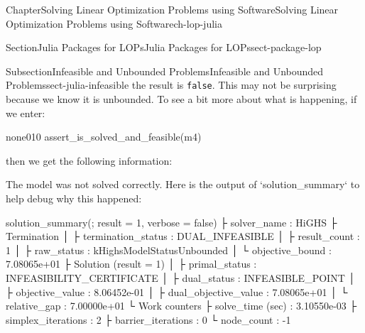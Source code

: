 \documentclass[oneside,10pt,]{book}
\newcommand{\mono}[1]{\texttt{#1}}
\numberwithin{equation}{section}
\begin{document}
\begin{chapterptx}{Chapter}{Solving Linear Optimization Problems using Software}{}{Solving Linear Optimization Problems using Software}{}{}{ch-lop-julia}
\begin{sectionptx}{Section}{Julia Packages for LOPs}{}{Julia Packages for LOPs}{}{}{sect-package-lop}
\begin{subsectionptx}{Subsection}{Infeasible and Unbounded Problems}{}{Infeasible and Unbounded Problems}{}{}{sect-julia-infeasible}
the result is \mono{false}. This may not be surprising because we know it is unbounded. To see a bit more about what is happening, if we enter:%
\begin{program}{none}{0}{1}{0}
assert_is_solved_and_feasible(m4)
\end{program}
then we get the following information:%
\par
%
\begin{codedisplay}
The model was not solved correctly. Here is the output of `solution_summary` to help debug why this happened:

solution_summary(; result = 1, verbose = false)
├ solver_name          : HiGHS
├ Termination
│ ├ termination_status : DUAL_INFEASIBLE
│ ├ result_count       : 1
│ ├ raw_status         : kHighsModelStatusUnbounded
│ └ objective_bound    : 7.08065e+01
├ Solution (result = 1)
│ ├ primal_status        : INFEASIBILITY_CERTIFICATE
│ ├ dual_status          : INFEASIBLE_POINT
│ ├ objective_value      : 8.06452e-01
│ ├ dual_objective_value : 7.08065e+01
│ └ relative_gap         : 7.00000e+01
└ Work counters
  ├ solve_time (sec)   : 3.10550e-03
  ├ simplex_iterations : 2
  ├ barrier_iterations : 0
  └ node_count         : -1



\end{codedisplay}
\end{subsectionptx}
\end{sectionptx}
\end{chapterptx}
\end{document}
